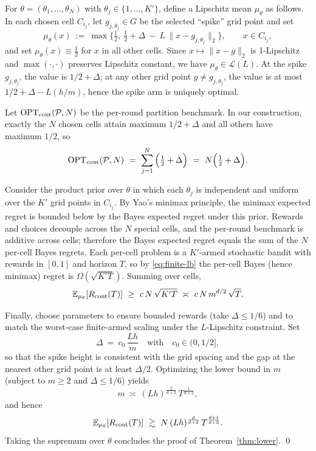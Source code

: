For $\theta=(\theta_1,\dots,\theta_N)$ with $\theta_j\in\{1,\dots,K'\}$, define a Lipschitz mean $\mu_\theta$ as follows. In each chosen cell $C_{i_j}$, let $g_{j,\theta_j}\in G$ be the selected “spike” grid point and set
\[
\mu_\theta(x)\ :=\
\max\!\Big\{\tfrac{1}{2},\ \tfrac{1}{2}+\Delta\ -\ L\,\|x-g_{j,\theta_j}\|_2\Big\},
\qquad x\in C_{i_j},
\]
and set $\mu_\theta(x)\equiv\tfrac{1}{2}$ for $x$ in all other cells. Since $x\mapsto \|x-g\|_2$ is 1-Lipschitz and $\max(\cdot,\cdot)$ preserves Lipschitz constant, we have $\mu_\theta\in\mathcal L(L)$. At the spike $g_{j,\theta_j}$, the value is $1/2+\Delta$; at any other grid point $g\neq g_{j,\theta_j}$, the value is at most $1/2+\Delta - L(h/m)$, hence the spike arm is uniquely optimal.

Let $\mathrm{OPT}_{\mathrm{cont}}(\mathcal{P},N)$ be the per-round partition benchmark. In our construction, exactly the $N$ chosen cells attain maximum $1/2+\Delta$ and all others have maximum $1/2$, so
\[
\OPT_{\cont}(\Pcal,N)\ =\ \sum_{j=1}^{N} \Big(\tfrac{1}{2}+\Delta\Big)\ =\ N\Big(\tfrac{1}{2}+\Delta\Big).
\]

Consider the product prior over $\theta$ in which each $\theta_j$ is independent and uniform over the $K'$ grid points in $C_{i_j}$. By Yao’s minimax principle, the minimax expected regret is bounded below by the Bayes expected regret under this prior. Rewards and choices decouple across the $N$ special cells, and the per-round benchmark is additive across cells; therefore the Bayes expected regret equals the sum of the $N$ per-cell Bayes regrets. Each per-cell problem is a $K'$-armed stochastic bandit with rewards in $[0,1]$ and horizon $T$, so by \eqref{eq:finite-lb} the per-cell Bayes (hence minimax) regret is $\Omega(\sqrt{K' T})$. Summing over cells,
\[
\EE_{\mu_\theta}\!\left[R_{\cont}(T)\right]\ \ge\ c\,N\,\sqrt{K' T}\ \asymp\ c\,N\,m^{d/2}\,\sqrt{T}.
\]

Finally, choose parameters to ensure bounded rewards (take $\Delta\le 1/6$) and to match the worst-case finite-armed scaling under the $L$-Lipschitz constraint. Set
\[
\Delta\ =\ c_0\,\frac{L h}{m}\quad\text{with}\quad c_0\in(0,1/2],
\]
so that the spike height is consistent with the grid spacing and the gap at the nearest other grid point is at least $\Delta/2$. Optimizing the lower bound in $m$ (subject to $m\ge 2$ and $\Delta\le 1/6$) yields
\[
m\ \asymp\ (L h)^{\frac{2}{d+2}}\,T^{\frac{1}{d+2}},
\]
and hence
\[
\EE_{\mu_\theta}\!\left[R_{\cont}(T)\right]\ \gtrsim\ N\,(L h)^{\frac{d}{d+2}}\,T^{\frac{d+1}{d+2}}.
\]
Taking the supremum over $\theta$ concludes the proof of Theorem~\ref{thm:lower}.
\qed

